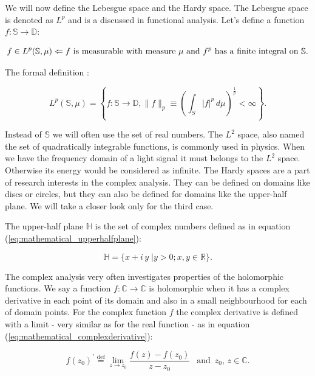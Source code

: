 \documentclass[12pt,twoside,a4paper]{article}
\numberwithin{equation}{subsection}
\numberwithin{figure}{subsection}
\begin{document}
We will now define the Lebesgue space and the Hardy space. The Lebesgue space is denoted as $L^p$ and is a discussed in functional analysis. 
Let's define a function $f : \mathbb{S} \to \mathbb{D}$:

\begin{equation} \label{eq:mathematical_first_lebesgue}
  f \in  L^p(\mathbb{S}, \mu) \Leftarrow \text{$f$ is measurable with measure $ \mu $ and $ f^p $ has a finite integral on $\mathbb{S}$}.
\end{equation}

The formal definition :

\begin{equation} \label{eg:mathematical_lebesgue}
  L^p(\mathbb{S}, \mu) = \left\{ f : \mathbb{S} \to \mathbb{D}, \|f\|_p \equiv ( \int_{S} |f|^p \, d\mu) ^ {\frac{1}{p}} < \infty \right\}.
\end{equation}

Instead of $\mathbb{S}$ we will often use the set of real numbers. The $L^2$ space, also named the set of quadratically integrable functions, is commonly used in physics. When we have the frequency domain of a light signal it must belongs to the $L^2$ space. Otherwise its energy would be considered as infinite. The Hardy spaces are a part of research interests in the complex analysis. They can be defined on domains like discs or circles, but they can also be defined for domains like the upper-half plane. We will take a closer look only for the third case.

The upper-half plane $ \mathbb{H} $ is the set of complex numbers defined as in equation (\ref{eq:mathematical_upperhalfplane}):

\begin{equation} \label{eq:mathematical_upperhalfplane}
  \mathbb{H} = \{ x + i \, y \;| y > 0; x, y \in \mathbb{R} \} .
\end{equation}

The complex analysis very often investigates properties of the holomorphic functions. We say a function $f : \mathbb{C} \to \mathbb{C}$ is holomorphic when it has a complex derivative in each point of its domain and also in a small neighbourhood for each of domain points. For the complex function $f$ the complex derivative is defined with a limit - very similar as for the real function - as in equation (\ref{eq:mathematical_complexderivative}):

\begin{equation} \label{eq:mathematical_complexderivative}
  f(z_0)^{'} \stackrel{\mathrm{def}}{=} \lim_{z \to z_0} \frac{f(z) - f(z_0)}{z - z_0} \; \, \text{ and } \, z_0, \, z \in \mathbb{C} .
\end{equation}
\end{document}
